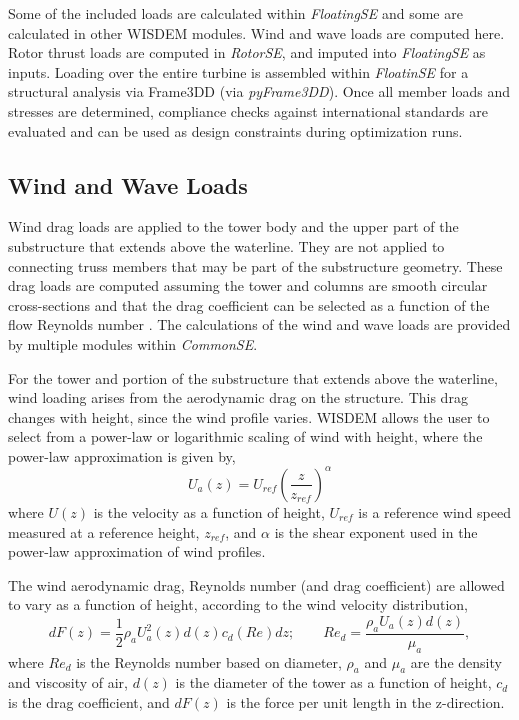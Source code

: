 Some of the included loads are calculated within \textit{FloatingSE} and
some are calculated in other WISDEM modules.  Wind and wave loads are
computed here.  Rotor thrust loads are computed in \textit{RotorSE}, and
imputed into \textit{FloatingSE} as inputs.  Loading over the entire
turbine is assembled within \textit{FloatinSE} for a structural analysis
via Frame3DD (via \textit{pyFrame3DD}).  Once all member loads and
stresses are determined, compliance checks against international
standards are evaluated and can be used as design constraints during
optimization runs.

\subsection{Wind and Wave Loads}
Wind drag loads are applied to the tower body and the upper part of the
substructure that extends above the waterline.  They are not applied to
connecting truss members that may be part of the substructure geometry.
These drag loads are
computed assuming the tower and columns are smooth circular
cross-sections and that the drag coefficient can be selected as a
function of the flow Reynolds number \citep{Roshko}.  The calculations
of the wind and wave loads are provided by multiple modules within
\textit{CommonSE}.

For the tower and portion of the substructure that extends above the
waterline, wind loading arises from the aerodynamic drag on the
structure.  This drag changes with height, since the wind profile
varies.  WISDEM allows the user to select from a power-law or
logarithmic scaling of wind with height, where the power-law
approximation is given by,
\[
  U_a(z) = U_{ref}\left(\frac{z}{z_{ref}}\right)^{\alpha}
\]
where $U(z)$ is the velocity as a function of height, $U_{ref}$ is a
reference wind speed measured at a reference height, $z_{ref}$, and
$\alpha$ is the shear exponent used in the power-law approximation of
wind profiles.

The wind aerodynamic drag, Reynolds number (and drag coefficient) are
allowed to vary as a function of height, according to the wind velocity
distribution,
\begin{equation} \label{eqn:drag}
  dF(z) = \frac{1}{2} \rho_a U_a^2(z) d(z) c_d(Re) dz;\qquad
  Re_d = \frac{\rho_a U_a(z) d(z)}{\mu_a},
\end{equation}
where $Re_d$ is the Reynolds number based on diameter, $\rho_a$ and
$\mu_a$ are the density and viscosity of air, $d(z)$ is the diameter of
the tower as a function of height, $c_d$ is the drag coefficient, and
$dF(z)$ is the force per unit length in the z-direction.

